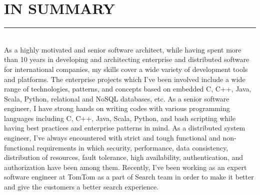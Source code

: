 \documentclass[10pt,a4paper]{article}
\begin{document}
\thispagestyle{fancy}

\hfill \break
\section{IN SUMMARY}
\noindent \rule {18.0cm}{0.2pt} \\
As a highly motivated and senior software architect, while having spent more than 10 years in developing and architecting enterprise and distributed software for international companies, my skills cover a wide variety of development tools and platforms. The enterprise projects which I've been involved include a wide range of technologies, patterns, and concepts based on embedded C, C++, Java, Scala, Python, relational and NoSQL databases, etc. As a senior software engineer, I have strong hands on writing codes with various programming languages including C, C++, Java, Scala, Python, and bash scripting while having best practices and enterprise patterns in mind. As a distributed system engineer, I've always encountered with strict and tough functional and non-functional requirements in which security, performance, data consistency, distribution of resources, fault tolerance, high availability, authentication, and authorization have been among them. Recently, I've been working as an expert software engineer at TomTom as a part of Search team in order to make it better and give the customers a better search experience.
\end{document}
